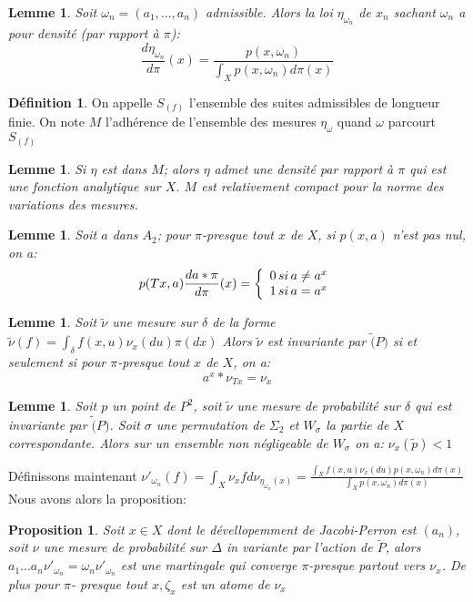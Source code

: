 \documentclass[12pt]{article}
\theoremstyle{plain}%
\newtheorem{lem}[thm]{Lemme}
\newtheorem{prop}[thm]{Proposition}
\theoremstyle{definition}
\newtheorem{dfnt}{Définition}[section]
\theoremstyle{remark}
\begin{document}
\begin{lem}
Soit $\omega_n=(a_1,...,a_n)$ admissible. Alors la loi $\eta_{\omega_n}$ de $x_n$ sachant $\omega_n$ a pour densité (par rapport à $\pi$):$$
\frac{d \eta_{\omega_n}}{d \pi}(x)=\frac{p(x,\omega_n)}{\int_X p(x,\omega_n) d \pi (x)}
$$
\end{lem}
\begin{dfnt}
On appelle $S_(f)$ l'ensemble des suites admissibles de longueur finie. On note $M$ l'adhérence de l'ensemble des mesures $\eta_\omega$ quand $\omega$ parcourt $S_(f)$
\end{dfnt}

\begin{lem}
Si $\eta$ est dans $M$; alors $\eta$ admet une densité par rapport à $\pi$ qui est une fonction analytique sur $X$. $M$ est relativement compact pour la norme des variations des mesures.
\end{lem}

\begin{lem}
Soit $a$ dans $A_2$; pour $\pi$-presque tout $x$ de $X$, si $p(x,a)$ n'est pas nul, on a:$$
p(Tx,a)\frac{d a* \pi}{d \pi}(x)=
\left \{
\begin{array}{r c }
0 \, si \,  a \ne a^x \\
1 \, si \, a=a^x
\end{array}
\right .
$$
\end{lem}

\begin{lem}
Soit $\tilde{\nu}$ une mesure sur $\delta$ de la forme $\tilde{\nu}(f)=\int_\delta f(x,u)\nu_x(du)\pi(dx)$ Alors $\tilde{\nu}$ est invariante par $\tilde(P)$ si et seulement si pour $\pi$-presque tout $x$ de $X$, on a:$$
a^x*\nu_{Tx}=\nu_x
$$
\end{lem}

\begin{lem}
Soit $p$ un point de $P^2$, soit $\tilde{\nu}$ une mesure de probabilité sur $\delta$ qui est invariante par $\tilde(P)$. Soit $\sigma$ une permutation de $\Sigma_2$ et $W_\sigma$ la partie de $X$ correspondante. Alors sur un ensemble non négligeable de $W_\sigma$ on a: $\nu_x(\tilde{p})<1 $
\end{lem}

Définissons maintenant $\nu'_{\omega_n}(f)=\int_X \nu_x f d\nu_{\eta_{\omega_n}(x)}=\frac{\int_X f(x,u) \nu_x (du) p(x,\omega_n) d \pi(x)}{\int_X p(x,\omega_n) d \pi(x)}$
Nous avons alors la proposition:

\begin{prop}
Soit $x \in X$ dont le dévellopemment de Jacobi-Perron est $(a_n)$, soit $\nu$ une mesure de probabilité sur $\Delta$ in variante par l'action de $\tilde{P}$, alors $a_1 ... a_n \nu'_{\omega_n}=\omega_n \nu'_{\omega_n}$ est une martingale qui converge $\pi$-presque partout vers $\nu_x$.
De plus pour $\pi$- presque tout $x,\zeta_x$ est un atome de $\nu_x$
\end{prop}
\end{document}

